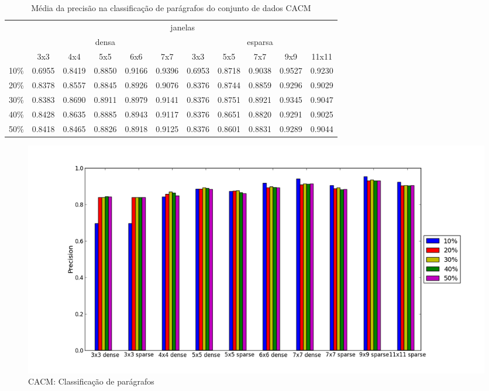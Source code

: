 \documentclass[a4paper,11pt]{article}
\begin{document}
  \begin{center}
    \begin{table}[p]
      \caption{Média da precisão na classificação de parágrafos do conjunto de dados CACM}
      \begin{tabular}{ l | c c c c c || c c c c c | }
        \cline{2-11}
        & \multicolumn{10}{|c|}{janelas} \\
        \cline{2-11}
        & \multicolumn{5}{c||}{densa} & \multicolumn{5}{c|}{esparsa} \\
        \cline{2-11}
        & 3x3 & 4x4 & 5x5 & 6x6 & 7x7 & 3x3 & 5x5 & 7x7 & 9x9 & 11x11 \\
        \hline
        \multicolumn{1}{|l|}{10\%}& 0.6955& 0.8419& 0.8850& 0.9166& 0.9396& 0.6953& 0.8718& 0.9038& 0.9527& 0.9230\\
        \multicolumn{1}{|l|}{20\%}& 0.8378& 0.8557& 0.8845& 0.8926& 0.9076& 0.8376& 0.8744& 0.8859& 0.9296& 0.9029\\
        \multicolumn{1}{|l|}{30\%}& 0.8383& 0.8690& 0.8911& 0.8979& 0.9141& 0.8376& 0.8751& 0.8921& 0.9345& 0.9047\\
        \multicolumn{1}{|l|}{40\%}& 0.8428& 0.8635& 0.8885& 0.8943& 0.9117& 0.8376& 0.8651& 0.8820& 0.9291& 0.9025\\
        \multicolumn{1}{|l|}{50\%}& 0.8418& 0.8465& 0.8826& 0.8918& 0.9125& 0.8376& 0.8601& 0.8831& 0.9289& 0.9044\\
        \hline  
      \end{tabular}
    \end{table}
  \end{center}
    
  \begin{figure}[p]
    \centerline{\includegraphics[width=1.2\textwidth]{assets/experiment_charts/cacm_TextRegion_paragraph_precision.png}}
    \caption{CACM: Classificação de parágrafos}
    \label{fig:cacm_TextRegion_paragraph_precision}
  \end{figure}
\end{document}

